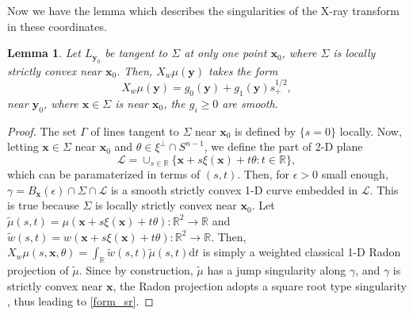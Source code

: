 \documentclass[a4paper,12pt]{amsart}
\numberwithin{equation}{section}
\theoremstyle{plain}
\numberwithin{theorem}{section}
\newtheorem{lemma}[theorem]{Lemma}
\theoremstyle{definition}
\theoremstyle{remark}
\theoremstyle{remark}
\theoremstyle{remark}
\newcommand{\vx}{{\mathbf{x}}}
\newcommand{\vy}{{\mathbf{y}}}
\begin{document}
Now we have the lemma which describes the singularities of the X-ray transform in these coordinates.
\begin{lemma}
Let $L_{\vy_0}$ be tangent to $\Sigma$ at only one point $\vx_0$, where $\Sigma$ is locally strictly convex near $\vx_0$. Then, $X_w\mu(\vy)$ takes the form
\begin{equation}\label{form_sr}
X_{w}\mu(\vy) = g_0(\vy) + g_1(\vy)s^{1/2}_+,
\end{equation}
near $\vy_0$, where $\vx \in \Sigma$ is near $\vx_0$, the $g_i \geq 0$ are smooth.%
\end{lemma}

\begin{proof}
The set $\Gamma$ of lines tangent to $\Sigma$ near $\vx_0$ is defined by $\{s = 0\}$ locally.
Now, letting $\vx \in \Sigma$ near $\vx_0$ and $\theta \in \xi^{\perp}\cap S^{n-1}$, we define the part of 2-D plane 
$$\mathcal{L} = \cup_{s\in \mathbb{R}} \{\vx + s\xi(\vx) + t\theta : t\in \mathbb{R}\},$$
which can be paramaterized in terms of $(s,t)$. Then, for $\epsilon > 0$ small enough, $\gamma = B_\vx(\epsilon) \cap \Sigma \cap \mathcal{L}$ is a smooth strictly convex 1-D curve embedded in $\mathcal{L}$. This is true because $\Sigma$ is locally strictly convex near $\vx_0$. Let $\tilde{\mu}(s,t) = \mu(\vx + s \xi(\vx) + t \theta) : \mathbb{R}^2\to \mathbb{R}$ and $\tilde{w}(s,t) = w(\vx + s \xi(\vx) + t \theta) : \mathbb{R}^2\to \mathbb{R}$. Then, $X_w\mu(s,\vx,\theta) = \int_\mathbb{R} \tilde{w}(s,t) \tilde{\mu}(s,t) \mathrm{d}t$ is simply a weighted classical 1-D Radon projection of $\tilde{\mu}$. Since by construction, $\tilde{\mu}$ has a jump singularity along $\gamma$, and $\gamma$ is strictly convex near $\vx$, the Radon projection adopts a square root type singularity \cite{katsevich2026analysis}, thus leading to \eqref{form_sr}.
\end{proof}
\end{document}
